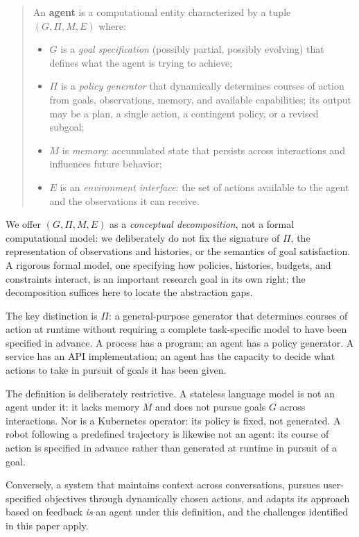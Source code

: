\documentclass[11pt]{article}
\begin{document}
\begin{quote}
An \textbf{agent} is a computational entity characterized by a tuple $(G, \Pi, M, E)$ where:
\begin{itemize}
    \item $G$ is a \textit{goal specification} (possibly partial, possibly evolving) that defines what the agent is trying to achieve;
    \item $\Pi$ is a \textit{policy generator} that dynamically determines courses of action from goals, observations, memory, and available capabilities; its output may be a plan, a single action, a contingent policy, or a revised subgoal;
    \item $M$ is \textit{memory\/}: accumulated state that persists across interactions and influences future behavior;
    \item $E$ is an \textit{environment interface\/}: the set of actions available to the agent and the observations it can receive.
\end{itemize}
\end{quote}

We offer $(G, \Pi, M, E)$ as a \textit{conceptual decomposition}, not a formal computational model: we deliberately do not fix the signature of $\Pi$, the representation of observations and histories, or the semantics of goal satisfaction. A rigorous formal model, one specifying how policies, histories, budgets, and constraints interact, is an important research goal in its own right; the decomposition suffices here to locate the abstraction gaps.

The key distinction is $\Pi$: a general-purpose generator that determines courses of action at runtime without requiring a complete task-specific model to have been specified in advance. A process has a program; an agent has a policy generator. A service has an API implementation; an agent has the capacity to decide what actions to take in pursuit of goals it has been given.

The definition is deliberately restrictive. A stateless language model is not an agent under it: it lacks memory $M$ and does not pursue goals $G$ across interactions. Nor is a Kubernetes operator: its policy is fixed, not generated. A robot following a predefined trajectory is likewise not an agent: its course of action is specified in advance rather than generated at runtime in pursuit of a goal.

Conversely, a system that maintains context across conversations, pursues user-specified objectives through dynamically chosen actions, and adapts its approach based on feedback \textit{is} an agent under this definition, and the challenges identified in this paper apply.
\end{document}
